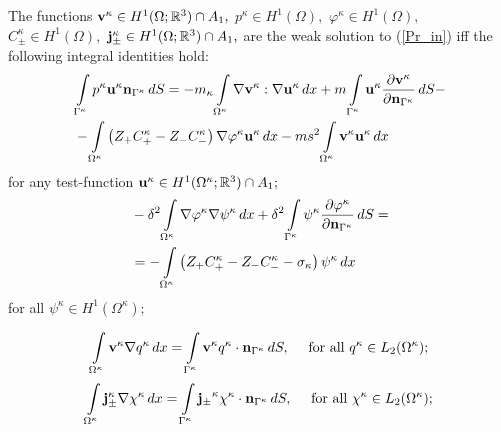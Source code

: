\documentclass{amsart}
\begin{document}
\begin{dfn}
The functions ${\bf v}^{\kappa}\in H^1(\Omega;\mathbb{R}^3)\cap A_1,$  $p^{\kappa}\in H^1(\Omega),$ $\varphi^{\kappa}\in H^1(\Omega),$  $C_{\pm}^{\kappa}\in H^1(\Omega),$  ${\bf j}_{\pm}^{\kappa}\in H^1(\Omega;\mathbb{R}^3)\cap A_1,$   are the weak
solution to (\ref{Pr_in}) iff the following integral identities hold:
\begin{equation}\label{weakvi}
\begin{aligned}
&\int\limits_{\Gamma^{\kappa}}p^{\kappa}{\bf u}^{\kappa}{\bf n}_{\Gamma^{\kappa}}\,dS=-m_{{\kappa}}\int\limits_{\Omega^{\kappa}}\nabla{\bf v}^{\kappa}:\nabla{\bf u}^{\kappa}\,dx+m\int\limits_{\Gamma^{\kappa}}{\bf u}^{\kappa}\frac{\partial {\bf v}^{\kappa} }{\partial{\bf n}_{\Gamma^{\kappa}}}\,dS-\\
&-\int\limits_{\Omega^{\kappa}}\left(Z_{+}C^{\kappa}_{+}-Z_{-}C^{\kappa}_{-}\right)\nabla{\varphi^{\kappa}}{\bf u}^{\kappa}\,dx-ms^2\int\limits_{\Omega^{\kappa}}{\bf v}^{\kappa}{\bf u}^{\kappa}\,dx
\end{aligned}
\end{equation}
for any test-function ${\bf u}^{\kappa}\in H^1(\Omega^{\kappa};\mathbb{R}^3)\cap A_1;$
\begin{equation}\label{weakfii}
\begin{aligned}
&-\delta^2 \int\limits_{\Omega^{\kappa}}\nabla{\varphi^{\kappa}}\nabla { \psi}^{\kappa}\,dx+
\delta^2\int\limits_{\Gamma^{\kappa}}{\psi^{\kappa}}\frac{\partial {\varphi^{\kappa}} }{\partial{\bf n}_{\Gamma^{\kappa}}}\,dS=\\
&=  -\int\limits_{\Omega^{\kappa}}\left(Z_{+}C^{\kappa}_{+}-Z_{-}C^{\kappa}_{-}-\sigma_{\kappa}\right){ \psi}^{\kappa}\,dx
\end{aligned}
\end{equation}
{ for all } ${\psi}^{\kappa}\in H^1(\Omega^{\kappa});$

\begin{equation}\label{divvi}
\int\limits_{\Omega^{\kappa}}{\bf v}^{\kappa}\nabla q^{\kappa}\,dx=\int\limits_{\Gamma^{\kappa}}{ {{\bf v}^{\kappa}}}q^{\kappa}\cdot {\bf n}_{\Gamma^{\kappa}}\,dS,\quad \text{ for all } q^{\kappa}\in L_2(\Omega^{\kappa});
\end{equation}
\begin{equation}\label{divji}
\int\limits_{\Omega^{\kappa}}{\bf j}_{\pm}^{\kappa}\nabla \chi^{\kappa}\,dx=\int\limits_{\Gamma^{\kappa}}{ {{\bf j}_{\pm}}^{\kappa}}\chi^{\kappa}\cdot {\bf n}_{\Gamma^{\kappa}}\,dS,\quad \text{ for all } \chi^{\kappa}\in L_2(\Omega^{\kappa});
\end{equation}


\end{dfn}
\end{document}
